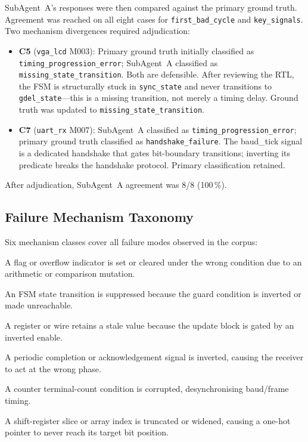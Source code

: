 \documentclass[11pt,a4paper]{article}
\newcommand{\metric}[1]{\texttt{#1}}
\begin{document}
SubAgent~A's responses were then compared against the primary ground truth.
Agreement was reached on all eight cases for \metric{first\_bad\_cycle} and
\metric{key\_signals}. Two mechanism divergences required adjudication:

\begin{itemize}
  \item \textbf{C5} (\texttt{vga\_lcd} M003): Primary ground truth initially
    classified as \texttt{timing\_progression\_error}; SubAgent~A classified as
    \texttt{missing\_state\_transition}. Both are defensible.  After reviewing
    the RTL, the FSM is structurally stuck in \texttt{sync\_state} and never
    transitions to \texttt{gdel\_state}---this is a missing transition, not
    merely a timing delay. Ground truth was updated to
    \texttt{missing\_state\_transition}.

  \item \textbf{C7} (\texttt{uart\_rx} M007): SubAgent~A classified as
    \texttt{timing\_progression\_error}; primary ground truth classified as
    \texttt{handshake\_failure}. The baud\_tick signal is a dedicated
    handshake that gates bit-boundary transitions; inverting its predicate
    breaks the handshake protocol. Primary classification retained.
\end{itemize}

After adjudication, SubAgent~A agreement was 8/8 (100\,\%).

\subsection{Failure Mechanism Taxonomy}

Six mechanism classes cover all failure modes observed in the corpus:

\begin{description}[leftmargin=2.5cm, style=sameline]
  \item[\texttt{overflow\_flag\_error}] A flag or overflow indicator is set or
    cleared under the wrong condition due to an arithmetic or comparison
    mutation.
  \item[\texttt{missing\_state\_transition}] An FSM state transition is
    suppressed because the guard condition is inverted or made unreachable.
  \item[\texttt{stuck\_signal}] A register or wire retains a stale value
    because the update block is gated by an inverted enable.
  \item[\texttt{handshake\_failure}] A periodic completion or acknowledgement
    signal is inverted, causing the receiver to act at the wrong phase.
  \item[\texttt{timing\_progression\_error}] A counter terminal-count
    condition is corrupted, desynchronising baud/frame timing.
  \item[\texttt{pointer\_index\_bug}] A shift-register slice or array index is
    truncated or widened, causing a one-hot pointer to never reach its target
    bit position.
\end{description}
\end{document}

